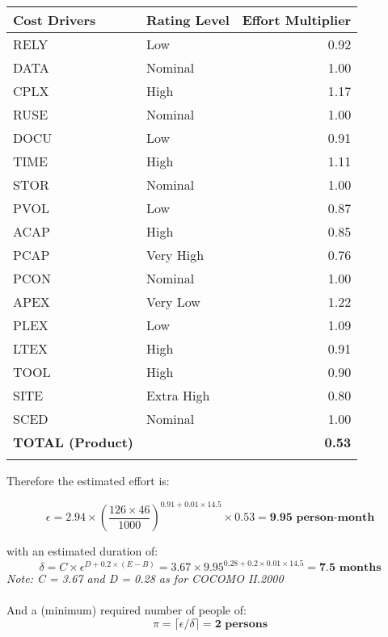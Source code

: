 {\renewcommand{\arraystretch}{1.5}

\begin{tabularx}{\textwidth}{X  X r}
    \hline 
    \textbf{Cost Drivers} & \textbf{Rating Level} &\textbf{Effort Multiplier}\\ 
    \hline 
    RELY & Low & 0.92\\
    \hline 
    DATA & Nominal & 1.00\\
    \hline
    CPLX & High & 1.17\\
    \hline
    RUSE & Nominal & 1.00\\
    \hline
    DOCU & Low & 0.91\\
    \hline
    TIME & High & 1.11\\
    \hline
    STOR & Nominal & 1.00\\
    \hline
    PVOL & Low & 0.87\\
    \hline
    ACAP & High & 0.85\\
    \hline
    PCAP & Very High & 0.76\\
    \hline
    PCON & Nominal & 1.00\\
    \hline
    APEX & Very Low & 1.22\\
    \hline
    PLEX & Low & 1.09\\
    \hline
    LTEX & High & 0.91\\
    \hline
    TOOL & High & 0.90\\
    \hline
    SITE & Extra High & 0.80\\
    \hline
    SCED & Nominal & 1.00\\
    \hline
    \textbf{TOTAL (Product)} &  & \textbf{0.53}\\
    \hline
    \caption{Cost Drivers Recap}\label{tab:em-summary}\\
\end{tabularx}}

Therefore the estimated effort is:

\begin{equation}
        \epsilon = 2.94 \times (\frac{126\times 46}{1000})^{0.91+0.01\times 14.5} \times 0.53 = \textbf{9.95 person-month}
\end{equation}

with an estimated duration of:
\begin{equation}
        \delta = C \times \epsilon^{D+0.2\times(E-B)} = 
        3.67 \times 9.95^{0.28+0.2\times 0.01 \times 14.5} = 
        \textbf{7.5 months}
\end{equation}
\textit{Note: C = 3.67 and D = 0.28 as for COCOMO II.2000}\\\\
And a (minimum) required number of people of:
\begin{equation}
        \pi = \lceil \epsilon / \delta \rceil = \textbf{2 persons}
\end{equation}